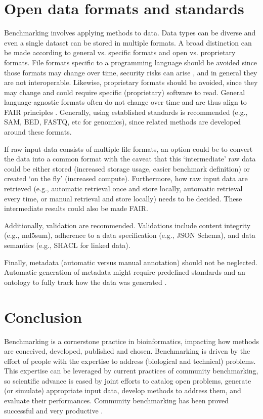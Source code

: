\documentclass[11pt]{article}
\begin{document}
\section*{Open data formats and standards}

Benchmarking involves applying methods to data. Data types can be diverse and even a single dataset can be stored in multiple formats. A broad distinction can be made according to general vs. specific formats and open vs. proprietary formats. File formats specific to a programming language should be avoided since those formats may change over time, security risks can arise \cite{Huynh2023-pq, Bleih2024-lv}, and in general they are not interoperable. Likewise, proprietary formats should be avoided, since they may change and could require specific (proprietary) software to read. General language-agnostic formats often do not change over time and are thus align to FAIR principles \cite{Wilkinson2016-bh}. Generally, using established standards is recommended (e.g., SAM, BED, FASTQ, etc for genomics), since related methods are developed around these formats.

If raw input data consists of multiple file formats, an option could be to convert the data into a common format with the caveat that this `intermediate' raw data could be either stored (increased storage usage, easier benchmark definition) or created `on the fly' (increased compute). Furthermore, how raw input data are retrieved (e.g., automatic retrieval once and store locally, automatic retrieval every time, or manual retrieval and store locally) needs to be decided. These intermediate results could also be made FAIR.

Additionally, validation are recommended. Validations include content integrity (e.g., md5sum), adherence to a data specification (e.g., JSON Schema), and data semantics (e.g., SHACL for linked data). 

Finally, metadata (automatic versus manual annotation) should not be neglected. Automatic generation of metadata might require predefined standards and an ontology to fully track how the data was generated \cite{LeboUnknown-om}. 

\section*{Conclusion}
\label{sec:conclusion}

Benchmarking is a cornerstone practice in bioinformatics, impacting how methods are conceived, developed, published and chosen. Benchmarking is driven by the effort of people with the expertise to address (biological and technical) problems. This expertise can be leveraged by current practices of community benchmarking, so scientific advance is eased by joint efforts to catalog open problems, generate (or simulate) appropriate input data, develop methods to address them, and evaluate their performances. Community benchmarking has been proved successful and very productive \cite{Moult2005-ne,Capella-Gutierrez2017-dh,Luecken2024-fk}.
\end{document}
